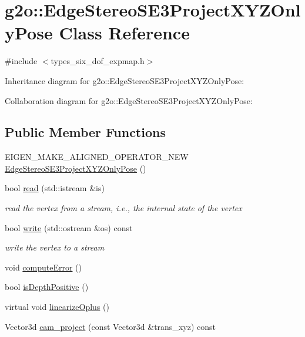 \hypertarget{classg2o_1_1EdgeStereoSE3ProjectXYZOnlyPose}{}\section{g2o\+:\+:Edge\+Stereo\+S\+E3\+Project\+X\+Y\+Z\+Only\+Pose Class Reference}
\label{classg2o_1_1EdgeStereoSE3ProjectXYZOnlyPose}


{\ttfamily \#include $<$types\+\_\+six\+\_\+dof\+\_\+expmap.\+h$>$}



Inheritance diagram for g2o\+:\+:Edge\+Stereo\+S\+E3\+Project\+X\+Y\+Z\+Only\+Pose\+:


Collaboration diagram for g2o\+:\+:Edge\+Stereo\+S\+E3\+Project\+X\+Y\+Z\+Only\+Pose\+:
\subsection*{Public Member Functions}
\begin{DoxyCompactItemize}
\item 
E\+I\+G\+E\+N\+\_\+\+M\+A\+K\+E\+\_\+\+A\+L\+I\+G\+N\+E\+D\+\_\+\+O\+P\+E\+R\+A\+T\+O\+R\+\_\+\+N\+EW \hyperlink{classg2o_1_1EdgeStereoSE3ProjectXYZOnlyPose_a083a4f79a0ac5ff0deab0c9e8e9c9907}{Edge\+Stereo\+S\+E3\+Project\+X\+Y\+Z\+Only\+Pose} ()
\item 
bool \hyperlink{classg2o_1_1EdgeStereoSE3ProjectXYZOnlyPose_ae199c5428259a7d50e9897029ae9fd70}{read} (std\+::istream \&is)
\begin{DoxyCompactList}\small\item\em read the vertex from a stream, i.\+e., the internal state of the vertex \end{DoxyCompactList}\item 
bool \hyperlink{classg2o_1_1EdgeStereoSE3ProjectXYZOnlyPose_aa31f6c66016ec7f362ab3028a53e8cc6}{write} (std\+::ostream \&os) const 
\begin{DoxyCompactList}\small\item\em write the vertex to a stream \end{DoxyCompactList}\item 
void \hyperlink{classg2o_1_1EdgeStereoSE3ProjectXYZOnlyPose_af6fd2fdbdc9b4a6bcf21303ff3b8ea83}{compute\+Error} ()
\item 
bool \hyperlink{classg2o_1_1EdgeStereoSE3ProjectXYZOnlyPose_a5155075418c27ce8a1387d739ccbdf26}{is\+Depth\+Positive} ()
\item 
virtual void \hyperlink{classg2o_1_1EdgeStereoSE3ProjectXYZOnlyPose_a0b2b815e8ae331276f33be374dcc1897}{linearize\+Oplus} ()
\item 
Vector3d \hyperlink{classg2o_1_1EdgeStereoSE3ProjectXYZOnlyPose_acea8d0b81ed369bb63cd2f318512406f}{cam\+\_\+project} (const Vector3d \&trans\+\_\+xyz) const 
\end{DoxyCompactItemize}
